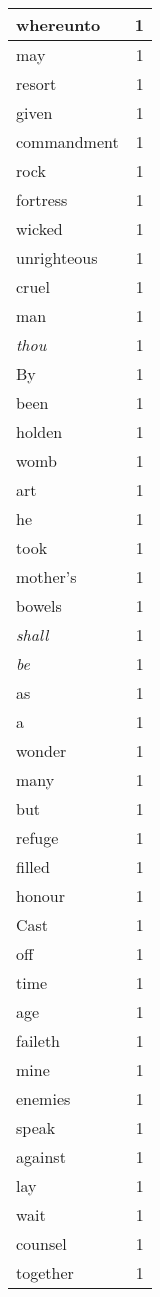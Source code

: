 \begin{center}
\begin{longtable}{l|r}
whereunto & 1 \\ \hline
may & 1 \\ \hline
resort & 1 \\ \hline
given & 1 \\ \hline
commandment & 1 \\ \hline
rock & 1 \\ \hline
fortress & 1 \\ \hline
wicked & 1 \\ \hline
unrighteous & 1 \\ \hline
cruel & 1 \\ \hline
man & 1 \\ \hline
\emph{thou} & 1 \\ \hline
By & 1 \\ \hline
been & 1 \\ \hline
holden & 1 \\ \hline
womb & 1 \\ \hline
art & 1 \\ \hline
he & 1 \\ \hline
took & 1 \\ \hline
mother's & 1 \\ \hline
bowels & 1 \\ \hline
\emph{shall} & 1 \\ \hline
\emph{be} & 1 \\ \hline
as & 1 \\ \hline
a & 1 \\ \hline
wonder & 1 \\ \hline
many & 1 \\ \hline
but & 1 \\ \hline
refuge & 1 \\ \hline
filled & 1 \\ \hline
honour & 1 \\ \hline
Cast & 1 \\ \hline
off & 1 \\ \hline
time & 1 \\ \hline
age & 1 \\ \hline
faileth & 1 \\ \hline
mine & 1 \\ \hline
enemies & 1 \\ \hline
speak & 1 \\ \hline
against & 1 \\ \hline
lay & 1 \\ \hline
wait & 1 \\ \hline
counsel & 1 \\ \hline
together & 1 \\ \hline

\end{longtable}
\end{center}
